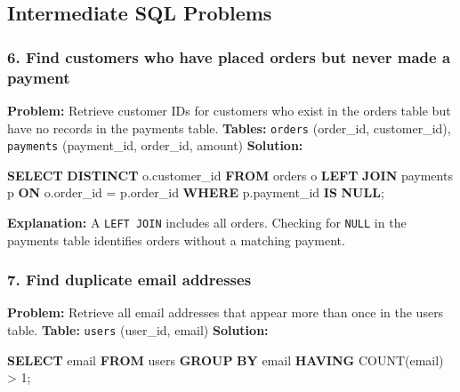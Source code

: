 \documentclass[
  11pt,
  openany,
  oneside]{book}
\newenvironment{Shaded}{}{}
\newcommand{\DecValTok}[1]{\textcolor[rgb]{0.25,0.63,0.44}{#1}}
\newcommand{\FunctionTok}[1]{\textcolor[rgb]{0.02,0.16,0.49}{#1}}
\newcommand{\KeywordTok}[1]{\textcolor[rgb]{0.00,0.44,0.13}{\textbf{#1}}}
\newcommand{\NormalTok}[1]{#1}
\newcommand{\OperatorTok}[1]{\textcolor[rgb]{0.40,0.40,0.40}{#1}}
\begin{document}
\subsection{Intermediate SQL Problems}\label{intermediate-sql-problems}

\subsubsection{6. Find customers who have placed orders but never made a
payment}\label{find-customers-who-have-placed-orders-but-never-made-a-payment}

\textbf{Problem:} Retrieve customer IDs for customers who exist in the
orders table but have no records in the payments table. \textbf{Tables:}
\texttt{orders} (order\_id, customer\_id), \texttt{payments}
(payment\_id, order\_id, amount) \textbf{Solution:}

\begin{Shaded}
\begin{Highlighting}[]
\KeywordTok{SELECT} \KeywordTok{DISTINCT}\NormalTok{ o.customer\_id }
\KeywordTok{FROM}\NormalTok{ orders o }
\KeywordTok{LEFT} \KeywordTok{JOIN}\NormalTok{ payments p }\KeywordTok{ON}\NormalTok{ o.order\_id }\OperatorTok{=}\NormalTok{ p.order\_id }
\KeywordTok{WHERE}\NormalTok{ p.payment\_id }\KeywordTok{IS} \KeywordTok{NULL}\NormalTok{;}
\end{Highlighting}
\end{Shaded}

\textbf{Explanation:} A \texttt{LEFT\ JOIN} includes all orders.
Checking for \texttt{NULL} in the payments table identifies orders
without a matching payment.

\subsubsection{7. Find duplicate email
addresses}\label{find-duplicate-email-addresses}

\textbf{Problem:} Retrieve all email addresses that appear more than
once in the users table. \textbf{Table:} \texttt{users} (user\_id,
email) \textbf{Solution:}

\begin{Shaded}
\begin{Highlighting}[]
\KeywordTok{SELECT}\NormalTok{ email }
\KeywordTok{FROM}\NormalTok{ users }
\KeywordTok{GROUP} \KeywordTok{BY}\NormalTok{ email }
\KeywordTok{HAVING} \FunctionTok{COUNT}\NormalTok{(email) }\OperatorTok{\textgreater{}} \DecValTok{1}\NormalTok{;}
\end{Highlighting}
\end{Shaded}
\end{document}

